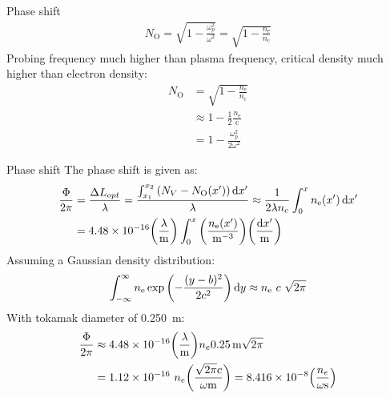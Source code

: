 \documentclass[hyperref={colorlinks=true,urlcolor=blue,linkcolor=.},aspectratio=1610,mathserif]{beamer}
\begin{document}
\begin{frame}{Phase shift}
	\centering
	\begin{align}
		N_\mathrm{O} = \sqrt{1-\frac{\omega_p^2}{\omega^2}} = \sqrt{1-\frac{n_\mathrm{e}}{n_\mathrm{c}}}
	\end{align}
	Probing frequency much higher than plasma frequency, critical density much higher than electron density:
	\begin{align}
		N_\mathrm{O} & = \sqrt{1-\frac{n_\mathrm{e}}{n_\mathrm{c}}}         \\
		             & \approx 1-\frac{1}{2}\frac{n_\mathrm{e}}{\mathrm{c}} \\
		             & = 1-\frac{\omega_p^2}{2\omega^2}
	\end{align}
\end{frame}

\begin{frame}{Phase shift}
	The phase shift is given as:
	\begin{align}
		\frac{\Phi}{2\pi} & = \frac{\Delta L_{opt}}{\lambda} = \frac{\int_{x_1}^{x_2}\pqty{N_V-N_{\mathrm{O}}(x')}\dd{x'}}{\lambda} \approx \frac{1}{2\lambda n_c}\int_{0}^{x}n_\mathrm{e}(x')\dd{x'} \nonumber \\
		                  & = 4.48\times 10^{-16} \pqty{\frac{\lambda}{\si{\meter}}}\int_{0}^{x}\pqty{\frac{n_\mathrm{e}(x')}{\si{\per\meter\cubed}}}\pqty{\frac{\dd{x'}}{\si{\meter}}}
	\end{align}
	Assuming a Gaussian density distribution:
	\begin{align}
		\int_{-\infty}^{\infty}n_\mathrm{e} \exp\pqty{-\frac{(y-b)^2}{2c^2}}\dd{y} \approx n_\mathrm{e}\ c\ \sqrt{2\pi}
	\end{align}
	With tokamak diameter of \SI{0.250}{\meter}:
	\begin{align}
		\frac{\Phi}{2\pi} & \approx 4.48\times 10^{-16}\pqty{\frac{\lambda}{\si{\meter}}}n_e\SI{0.25}{\meter}\sqrt{2\pi}                                          \\
		                  & = 1.12\times 10^{-16}\ n_e  \pqty{\frac{\sqrt{2\pi} c}{\omega\si{\meter}}} = 8.416\times 10^{-8}\pqty{\frac{n_e}{\omega\si{\second}}}
	\end{align}
\end{frame}
\end{document}
